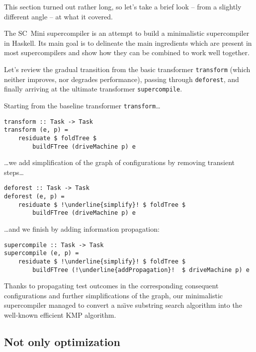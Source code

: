 This section turned out rather long, so let's take a brief look -- from 
a slightly different angle -- at what it covered.

The SC~Mini supercompiler is an attempt to build a minimalistic supercompiler in Haskell.
Its main goal is to delineate the main ingredients which are present in most supercompilers
and show how they can be combined to work well together.

Let's review the gradual transition from the basic transformer \texttt{transform}
(which neither improves, nor degrades performance), passing through \texttt{deforest},
and finally arriving at the ultimate transformer \texttt{supercompile}.

\noindent Starting from the baseline transformer \texttt{transform}\ldots
\begin{lstlisting}[escapechar=!]
transform :: Task -> Task
transform (e, p) =
	residuate $ foldTree $
		buildFTree (driveMachine p) e
\end{lstlisting}
\ldots we add simplification of the graph of configurations by removing transient steps\ldots
\begin{lstlisting}[escapechar=!]
deforest :: Task -> Task
deforest (e, p) =
	residuate $ !\underline{simplify}! $ foldTree $
    	buildFTree (driveMachine p) e
\end{lstlisting}
\ldots and we finish by adding information propagation:
\begin{lstlisting}[escapechar=!]
supercompile :: Task -> Task
supercompile (e, p) =
	residuate $ !\underline{simplify}! $ foldTree $
		buildFTree (!\underline{addPropagation}!  $ driveMachine p) e
\end{lstlisting}

Thanks to propagating test outcomes in the corresponding consequent configurations
and further simplifications of the graph, our minimalistic supercompiler
managed to convert a na\"{\i}ve substring search algorithm into the well-known
efficient KMP algorithm.

\subsection{Not only optimization}

